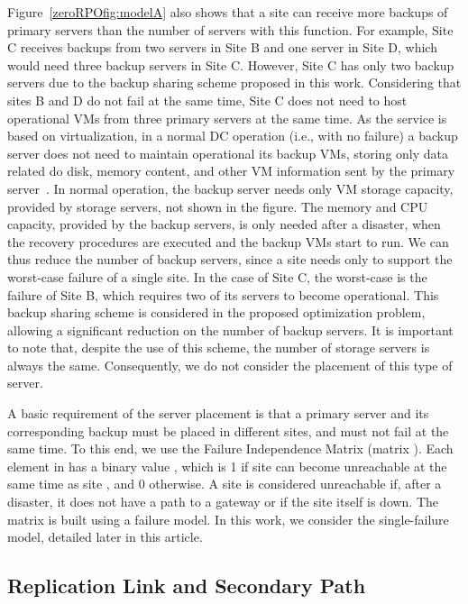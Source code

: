 \documentclass[preprint]{elsarticle}
\begin{document}
Figure~\ref{zeroRPOfig:modelA} also shows that a site can receive more backups of primary servers than the number of servers with this function. For example, Site C receives backups from two servers in Site B and one server in Site D, which would need three backup servers in Site C. However, Site C has only two backup servers due to the backup sharing scheme proposed in this work. 
Considering that sites B and D do not fail at the same time, Site C does not need to host operational VMs from three primary servers at the same time. As the service is based on virtualization, in a normal DC operation (i.e., with no failure) a backup server does not need to maintain operational its backup VMs, storing only data related do disk, memory content, and other VM information sent by the primary server~\cite{couto2014Network,wood2010disaster}. In normal operation, the backup server needs only VM storage capacity, provided by storage servers, not shown in the figure. The memory and CPU capacity, provided by the backup servers, is only needed after a disaster, when the recovery procedures are executed and the backup VMs start to run. We can thus reduce the number of backup servers, since a site needs only to support the worst-case failure of a single site.
In the case of Site C, the worst-case is the failure of Site B, which requires two of its servers to become operational.
This backup sharing scheme is considered in the proposed optimization problem, allowing a significant reduction on the number of backup servers. It is important to note that, despite the use of this scheme, the number of storage servers is always the same. Consequently, we do not consider the placement of this type of server.

A basic requirement of the server placement is that a primary server and its corresponding backup must be placed in different sites, and must not fail at the same time. To this end, we use the Failure Independence Matrix (matrix ).
Each element in  has a binary value , which is 1 if site  can become unreachable at the same time as site , and 0 otherwise. A site is considered unreachable if, after a disaster, it does not have a path to a gateway or if the site itself is down. The matrix  is built using a failure model. In this work, we consider the single-failure model, detailed later in this article.

\subsection{Replication Link and Secondary Path}
\end{document}
